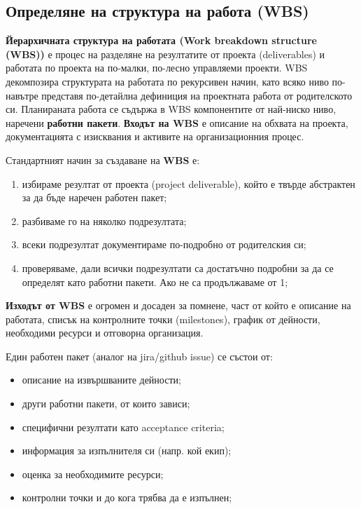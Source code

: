 \documentclass[fleqn,12pt]{article}
\begin{document}
\subsection{Определяне на структура на работа (WBS)}

\textbf{Йерархичната структура на работата (Work breakdown structure (WBS))} е процес на разделяне на резултатите от проекта (deliverables) и работата по проекта на по-малки, по-лесно управляеми проекти.
WBS декомпозира структурата на работата по рекурсивен начин, като всяко ниво по-навътре представя по-детайлна дефиниция на проектната работа от родителското си.
Планираната работа се съдържа в WBS компонентите от най-ниско ниво, наречени \textbf{работни пакети}.
\bigbreak
\textbf{Входът на WBS} е описание на обхвата на проекта, документацията с изисквания и активите на организационния процес.
\bigbreak

Стандартният начин за създаване на \textbf{WBS} е:
\begin{enumerate}
    \item избираме резултат от проекта (project deliverable), който е твърде абстрактен за да бъде наречен работен пакет;
    \item разбиваме го на няколко подрезултата;
    \item всеки подрезултат документираме по-подробно от родителския си;
    \item проверяваме, дали всички подрезултати са достатъчно подробни за да се определят като работни пакети. Ако не са продължаваме от 1;
\end{enumerate}

\textbf{Изходът от WBS} е огромен и досаден за помнене, част от който е описание на работата, списък на контролните точки (milestones), график от дейности, необходими ресурси и отговорна организация.
\bigbreak

Един работен пакет (аналог на jira/github issue) се състои от:
\begin{itemize}
    \item описание на извършваните дейности;
    \item други работни пакети, от които зависи;
    \item специфични резултати като acceptance criteria;
    \item информация за изпълнителя си (напр. кой екип);
    \item оценка за необходимите ресурси;
    \item контролни точки и до кога трябва да е изпълнен;
\end{itemize}
\bigbreak
\end{document}
